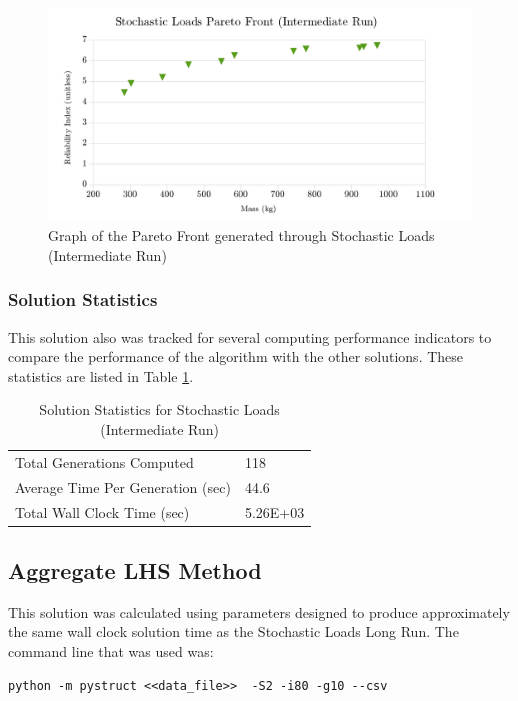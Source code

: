 \begin{figure}
\includegraphics[width=\textwidth]{img/pf_sto_int.png}
	\caption{Graph of the Pareto Front generated through Stochastic Loads (Intermediate Run)}
\label{fig:pfront_sto_int}
\end{figure}

\subsubsection{Solution Statistics}
This solution also was tracked for several computing performance indicators to compare the performance of the algorithm with the other solutions. These statistics are listed in Table \ref{tab:stat_sto_int}. 

\begin{table}[!htbp]
  \caption{Solution Statistics for Stochastic Loads (Intermediate Run)}
  \label{tab:stat_sto_int}
  \centering
  \begin{tabular}{|l|l|}
    \hline
	  Total Generations Computed & 118\\
    Average Time Per Generation (sec) & 44.6\\
    Total Wall Clock Time (sec)	 & 5.26E+03\\
    \hline
  \end{tabular}
\end{table}




\subsection{Aggregate LHS Method}
This solution was calculated using parameters designed to produce approximately the same wall clock solution time as the Stochastic Loads Long Run. The command line that was used was:

\begin{verbatim}
python -m pystruct <<data_file>>  -S2 -i80 -g10 --csv
\end{verbatim}


